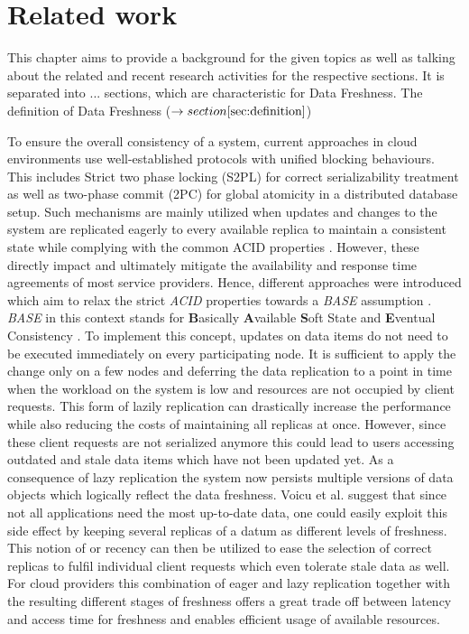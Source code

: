 
\chapter{Related work}
\label{c:related}

This chapter aims to provide a background for the given topics as well as talking about the related and recent research activities for the respective sections.
It is separated into ... sections, which are characteristic for Data Freshness.
The definition of Data Freshness ($\rightarrow section \ref{sec:definition}$)

To ensure the overall consistency of a system, current approaches in cloud environments use well-established protocols with unified blocking behaviours. 
This includes Strict two phase locking (S2PL) for correct serializability treatment as well as two-phase commit (2PC) for global atomicity in a distributed database 
setup. Such mechanisms are mainly utilized when updates and changes to the system are replicated eagerly to every available replica to maintain a consistent state
while complying with the common ACID properties \cite{tamer:2005}.
However, these  directly impact and ultimately mitigate the availability and response time 
agreements of most service providers.
Hence, different approaches were introduced which aim to relax the strict \textit{ACID} properties towards 
a \textit{BASE} assumption \cite{base2008}.
\textit{BASE} in this context stands for \textbf{B}asically \textbf{A}vailable \textbf{S}oft 
State and \textbf{E}ventual Consistency \cite{shapiro:2011}.
To implement this concept, updates on data items do not need to be executed immediately on every participating node.
It is sufficient to apply the change only on a few nodes and deferring the data replication to a point in time when the workload on the system is low and 
resources are not occupied by client requests. This form of lazily replication can drastically increase the performance while also reducing the costs of maintaining
all replicas at once. However, since these client requests are not serialized anymore this could lead to users accessing outdated and stale data items
which have not been updated yet.
As a consequence of lazy replication the system now persists multiple versions of data objects which logically reflect the data freshness.
Voicu et al. \cite{voicu:2010} suggest that since not all applications need the most up-to-date data, one could easily exploit 
this side effect by keeping several replicas of a datum as different levels of freshness.
This notion of or recency can then be utilized to ease the selection of correct replicas to fulfil individual client requests which even tolerate stale data as well.
For cloud providers this combination of eager and lazy replication together with the resulting different stages of freshness 
offers a great trade off between latency and access time for freshness and enables efficient usage of available resources.


